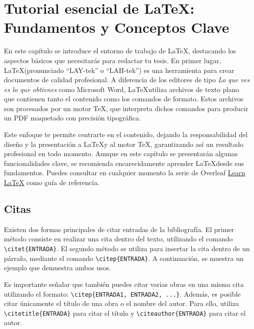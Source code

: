 \chapter[Tutorial esencial de LaTeX: Fundamentos y Conceptos Clave]{Tutorial esencial de LaTeX: Fundamentos y Conceptos Clave}
\label{cp:latex-tutorial}

{
\parindent0pt

En este capítulo se introduce el entorno de trabajo de \LaTeX, destacando los aspectos básicos que necesitarás para redactar tu tesis. En primer lugar, \LaTeX (pronunciado “LAY-tek” o “LAH-tek”) es una herramienta para crear documentos de calidad profesional. A diferencia de los editores de tipo \textit{Lo que ves es lo que obtienes} como Microsoft Word, \LaTeX utiliza archivos de texto plano que contienen tanto el contenido como los comandos de formato. Estos archivos son procesados por un motor TeX, que interpreta dichos comandos para producir un PDF maquetado con precisión tipográfica.

Este enfoque te permite centrarte en el contenido, dejando la responsabilidad del diseño y la presentación a \LaTeX y al motor TeX, garantizando así un resultado profesional en todo momento. Aunque en este capítulo se presentarán algunas funcionalidades clave, se recomienda encarecidamente aprender \LaTeX desde sus fundamentos. Puedes consultar en cualquier momento la serie de Overleaf \href{https://www.overleaf.com/learn/latex/Learn_LaTeX_in_30_minutes}{Learn LaTeX} como guía de referencia.
}

\section{Citas}
\label{sec:citations}

Existen dos formas principales de citar entradas de la bibliografía. El primer método consiste en realizar una cita dentro del texto, utilizando el comando \verb|\citet{ENTRADA}|. El segundo método se utiliza para insertar la cita dentro de un párrafo, mediante el comando \verb|\citep{ENTRADA}|. A continuación, se muestra un ejemplo que demuestra ambos usos.

Es importante señalar que también puedes citar varias obras en una misma cita utilizando el formato: \verb|\citep{ENTRADA1, ENTRADA2, ...}|. Además, es posible citar únicamente el título de una obra o el nombre del autor. Para ello, utiliza \verb|\citetitle{ENTRADA}| para citar el título y \verb|\citeauthor{ENTRADA}| para citar el autor.

